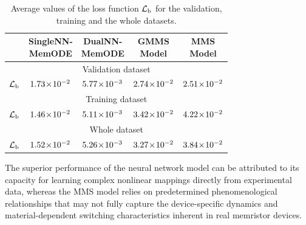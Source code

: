 \documentclass{ieeeaccess}
\begin{document}
\begin{table}
  \caption{Average values of the loss function \(\mathcal{L}_{\text{b}}\) for the validation, training and the whole datasets.}
  \label{tab:mms_comp_test}
\begin{center}
	  \begin{tabular}{c|cccc}
    \toprule
     & \makecell{SingleNN-\\MemODE} & \makecell{DualNN-\\ MemODE} & \makecell{GMMS\\Model} & \makecell{MMS\\Model}\\ 
    \midrule
     \multicolumn{5}{c}{Validation dataset} \\
    \midrule
    \(\mathcal{L}_{\text{b}}\) & \(1.73 \!\times\! 10^{-2}\) & \color{ieeegreen} \bfseries \(5.77 \!\times\! 10^{-3}\) & \color{ieeered} \bfseries \(2.74 \!\times\! 10^{-2}\) & \(2.51 \!\times\! 10^{-2}\) \\
    \toprule
    \multicolumn{5}{c}{Training dataset} \\
    \midrule
    \(\mathcal{L}_{\text{b}}\) &\(1.46 \!\times\! 10^{-2}\) & \color{ieeegreen} \bfseries \(5.11 \!\times\! 10^{-3}\) & \(3.42 \!\times\! 10^{-2}\) & \color{ieeered} \bfseries \(4.22 \!\times\! 10^{-2}\) \\
    \toprule
    \multicolumn{5}{c}{Whole dataset} \\
    \midrule
    \(\mathcal{L}_{\text{b}}\) & \(1.52 \!\times\! 10^{-2}\) & \color{ieeegreen} \bfseries \(5.26 \!\times\! 10^{-3}\) & \(3.27 \!\times\! 10^{-2}\) & \color{ieeered} \bfseries \(3.84 \!\times\! 10^{-2}\) \\
    \bottomrule  \end{tabular}
\end{center}
\end{table}



The superior performance of the neural network model can be attributed to its capacity for learning complex nonlinear mappings directly from experimental data, whereas the MMS model relies on predetermined phenomenological relationships that may not fully capture the device-specific dynamics and material-dependent switching characteristics inherent in real memristor devices. 
\end{document}
